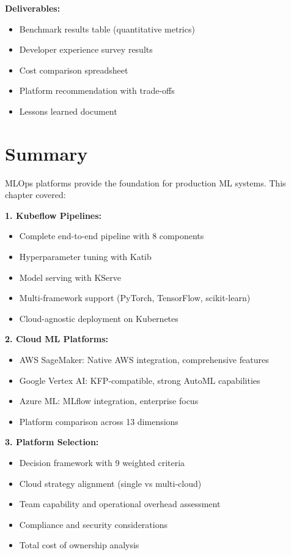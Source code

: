 \textbf{Deliverables:}
\begin{itemize}
    \item Benchmark results table (quantitative metrics)
    \item Developer experience survey results
    \item Cost comparison spreadsheet
    \item Platform recommendation with trade-offs
    \item Lessons learned document
\end{itemize}

\section{Summary}

MLOps platforms provide the foundation for production ML systems. This chapter covered:

\textbf{1. Kubeflow Pipelines:}
\begin{itemize}
    \item Complete end-to-end pipeline with 8 components
    \item Hyperparameter tuning with Katib
    \item Model serving with KServe
    \item Multi-framework support (PyTorch, TensorFlow, scikit-learn)
    \item Cloud-agnostic deployment on Kubernetes
\end{itemize}

\textbf{2. Cloud ML Platforms:}
\begin{itemize}
    \item AWS SageMaker: Native AWS integration, comprehensive features
    \item Google Vertex AI: KFP-compatible, strong AutoML capabilities
    \item Azure ML: MLflow integration, enterprise focus
    \item Platform comparison across 13 dimensions
\end{itemize}

\textbf{3. Platform Selection:}
\begin{itemize}
    \item Decision framework with 9 weighted criteria
    \item Cloud strategy alignment (single vs multi-cloud)
    \item Team capability and operational overhead assessment
    \item Compliance and security considerations
    \item Total cost of ownership analysis
\end{itemize}

